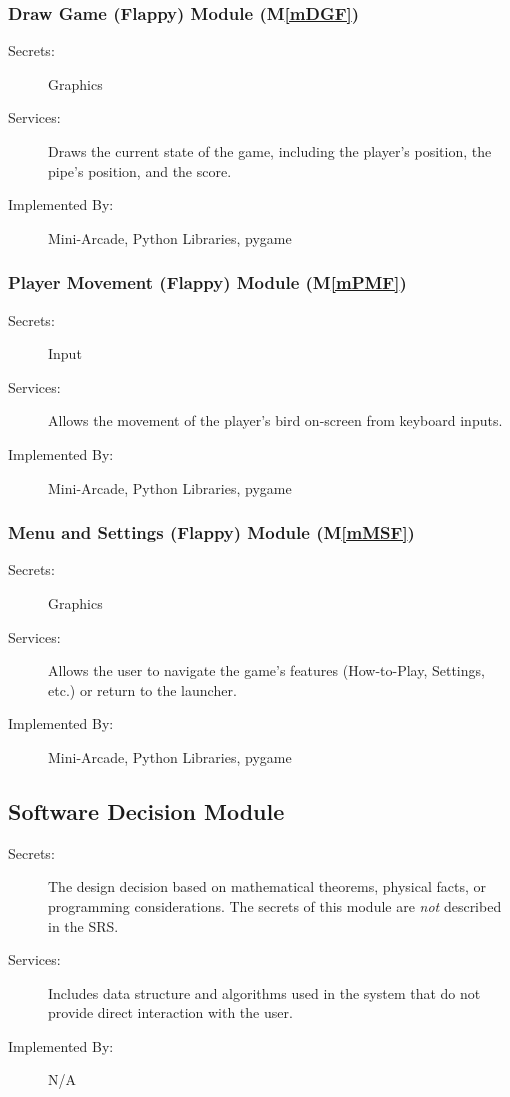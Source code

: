 \documentclass[12pt, titlepage]{article}
\newcommand{\mref}[1]{M\ref{#1}}
\begin{document}
\subsubsection{Draw Game (Flappy) Module (\mref{mDGF})}
\begin{description}
\item[Secrets:] Graphics
\item[Services:] Draws the current state of the game, including the player's position, the pipe's position, and the score.
\item[Implemented By:] Mini-Arcade, Python Libraries, pygame
\end{description}

\subsubsection{Player Movement (Flappy) Module (\mref{mPMF})}
\begin{description}
\item[Secrets:] Input
\item[Services:] Allows the movement of the player's bird on-screen from keyboard inputs.
\item[Implemented By:] Mini-Arcade, Python Libraries, pygame
\end{description}

\subsubsection{Menu and Settings (Flappy) Module (\mref{mMSF})}
\begin{description}
\item[Secrets:] Graphics
\item[Services:] Allows the user to navigate the game's features (How-to-Play, Settings, etc.) or return to the launcher.
\item[Implemented By:] Mini-Arcade, Python Libraries, pygame
\end{description}



\subsection{Software Decision Module}

\begin{description}
\item[Secrets:] The design decision based on mathematical theorems, physical
  facts, or programming considerations. The secrets of this module are
  \emph{not} described in the SRS.
\item[Services:] Includes data structure and algorithms used in the system that
  do not provide direct interaction with the user. 
\item[Implemented By:] N/A
\end{description}
\end{document}

